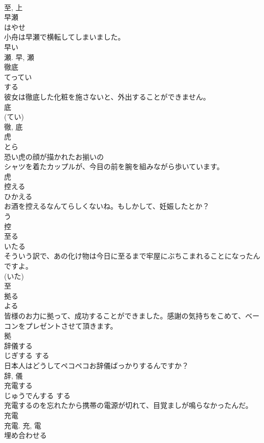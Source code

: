 \documentclass[8pt]{extreport}
\begin{document}
\begin{CJK}{UTF8}{min}
\\	至, 上	
\\	早瀬	
\\	はやせ	
\\	小舟は早瀬で横転してしまいました。	
\\	早い 
\\	瀬.	早, 瀬	
\\	徹底	
\\	てってい	
\\	する 
\\	彼女は徹底した化粧を施さないと、外出することができません。	
\\	底 
\\	(てい) 
\\	徹, 底	
\\	虎	
\\	とら	
\\	恐い虎の顔が描かれたお揃いの
\\	シャツを着たカップルが、今目の前を腕を組みながら歩いています。	
\\	虎	
\\	控える	
\\	ひかえる	
\\	お酒を控えるなんてらしくないね。もしかして、妊娠したとか？	
\\	う 
\\	控	
\\	至る	
\\	いたる	
\\	そういう訳で、あの化け物は今日に至るまで牢屋にぶちこまれることになったんですよ。	
\\	(いた) 
\\	至	
\\	拠る	
\\	よる	
\\	皆様のお力に拠って、成功することができました。感謝の気持ちをこめて、ベーコンをプレゼントさせて頂きます。	
\\	拠	
\\	辞儀する	
\\	じぎする	する 
\\	日本人はどうしてペコペコお辞儀ばっかりするんですか？	
\\	辞, 儀	
\\	充電する	
\\	じゅうでんする	する 
\\	充電するのを忘れたから携帯の電源が切れて、目覚ましが鳴らなかったんだ。	
\\	充電 
\\	充電.	充, 電	
\\	埋め合わせる	

\end{CJK}
\end{document}
